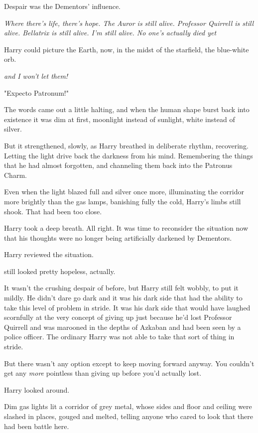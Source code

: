 Despair was the Dementors' influence.

\emph{Where there's life, there's hope. The Auror is still alive. Professor
Quirrell is still alive. Bellatrix is still alive. I'm still alive. No one's
actually died yet{\el}}

Harry could picture the Earth, now, in the midst of the starfield, the
blue-white orb.

\emph{{\el}and I won't let them!}

"Expecto Patronum!"

The words came out a little halting, and when the human shape burst back into
existence it was dim at first, moonlight instead of sunlight, white instead of
silver.

But it strengthened, slowly, as Harry breathed in deliberate rhythm,
recovering. Letting the light drive back the darkness from his mind.
Remembering the things that he had almost forgotten, and channeling them back
into the Patronus Charm.

Even when the light blazed full and silver once more, illuminating the corridor
more brightly than the gas lamps, banishing fully the cold, Harry's limbs still
shook. That had been too close.

Harry took a deep breath. All right. It was time to reconsider the situation
now that his thoughts were no longer being artificially darkened by Dementors.

Harry reviewed the situation.

{\el} still looked pretty hopeless, actually.

It wasn't the crushing despair of before, but Harry still felt wobbly, to put
it mildly. He didn't dare go dark and it was his dark side that had the ability
to take this level of problem in stride. It was his dark side that would have
laughed scornfully at the very concept of giving up just because he'd lost
Professor Quirrell and was marooned in the depths of Azkaban and had been seen
by a police officer. The ordinary Harry was not able to take that sort of thing
in stride.

But there wasn't any option except to keep moving forward anyway. You couldn't
get any \emph{more} pointless than giving up before you'd actually lost.

Harry looked around.

Dim gas lights lit a corridor of grey metal, whose sides and floor and ceiling
were slashed in places, gouged and melted, telling anyone who cared to look
that there had been battle here.

